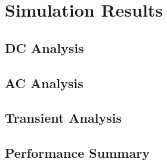 
\section{Simulation Results}
\label{sec:simulation_results}

\subsection{DC Analysis}



\subsection{AC Analysis}



\subsection{Transient Analysis}



\subsection{Performance Summary}

